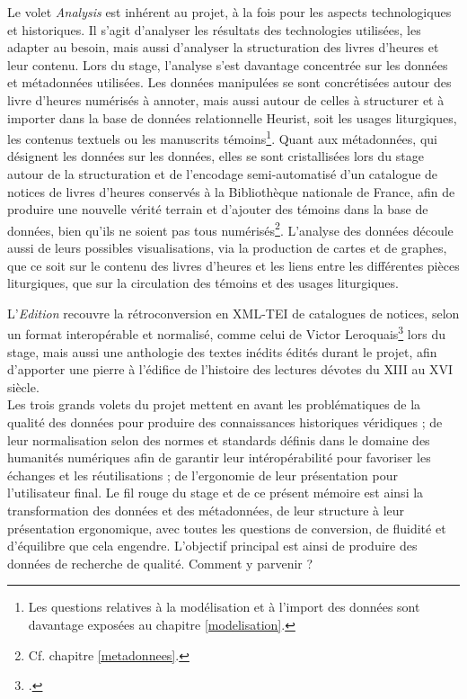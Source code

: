 \documentclass[a4paper,12pt,twoside]{book}
\begin{document}
Le volet \textit{Analysis} est inhérent au projet, à la fois pour les aspects technologiques et historiques. Il s'agit d'analyser les résultats des technologies utilisées, les adapter au besoin, mais aussi d'analyser la structuration des livres d'heures et leur contenu. Lors du stage, l'analyse s'est davantage concentrée sur les données et métadonnées utilisées. Les données manipulées se sont concrétisées autour des livre d'heures numérisés à annoter, mais aussi autour de celles à structurer et à importer dans la base de données relationnelle Heurist, soit les usages liturgiques, les contenus textuels ou les manuscrits témoins\footnote{Les questions relatives à la modélisation et à l'import des données sont davantage exposées au chapitre \ref{modelisation}.}. Quant aux métadonnées, qui désignent les données sur les données, elles se sont cristallisées lors du stage autour de la structuration et de l'encodage semi-automatisé d'un catalogue de notices de livres d'heures conservés à la Bibliothèque nationale de France, afin de produire une nouvelle vérité terrain et d'ajouter des témoins dans la base de données, bien qu'ils ne soient pas tous numérisés\footnote{Cf. chapitre \ref{metadonnees}.}. L'analyse des données découle aussi de leurs possibles visualisations, via la production de cartes et de graphes, que ce soit sur le contenu des livres d'heures et les liens entre les différentes pièces liturgiques, que sur la circulation des témoins et des usages liturgiques. 

L'\textit{Edition} recouvre la rétroconversion en XML-TEI de catalogues de notices, selon un format interopérable et normalisé, comme celui de Victor Leroquais\footcite{Leroquais_notices} lors du stage, mais aussi une anthologie des textes inédits édités durant le projet, afin d'apporter une pierre à l'édifice de l'histoire des lectures dévotes du \textsc{XIII} au \textsc{XVI} siècle. \\

Les trois grands volets du projet mettent en avant les problématiques de la qualité des données pour produire des connaissances historiques véridiques ; de leur normalisation selon des normes et standards définis dans le domaine des humanités numériques afin de garantir leur intéropérabilité pour favoriser les échanges et les réutilisations ; de l'ergonomie de leur présentation pour l'utilisateur final. Le fil rouge du stage et de ce présent mémoire est ainsi la transformation des données et des métadonnées, de leur structure à leur présentation ergonomique, avec toutes les questions de conversion, de fluidité et d’équilibre que cela engendre. L’objectif principal est ainsi de produire des données de recherche de qualité. Comment y parvenir ? \\
\end{document}
